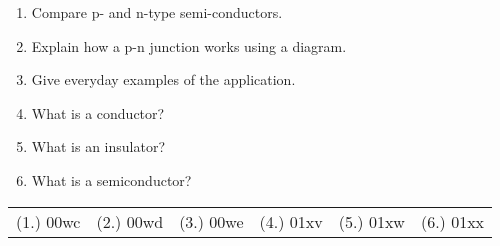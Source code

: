 \begin{eocexercises}{}
\begin{enumerate}
\item Compare p- and n-type semi-conductors.
\item Explain how a p-n junction works using a diagram.
\item Give everyday examples of the application.
\item{What is a conductor?}
\item{What is an insulator?}
\item{What is a semiconductor?}
\end{enumerate}
\practiceinfo

\begin{tabular}[h]{cccccc}
(1.) 00wc & (2.) 00wd & (3.) 00we & (4.) 01xv & (5.) 01xw & (6.) 01xx & 
 \end{tabular}
\end{eocexercises}
